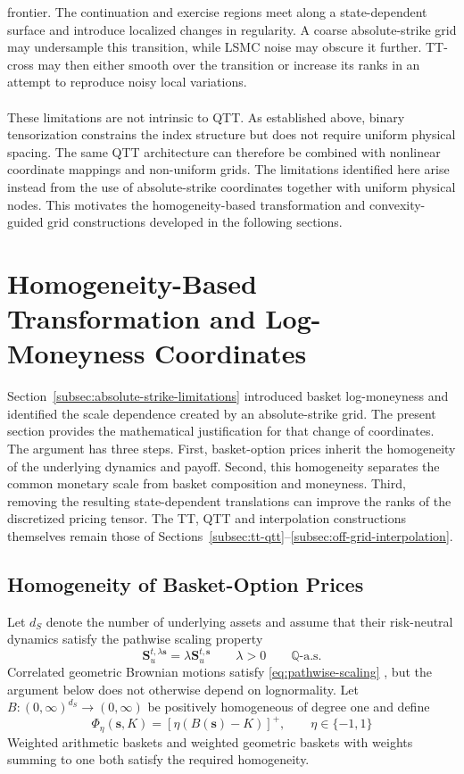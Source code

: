 \documentclass{article}
\numberwithin{equation}{subsection}
\theoremstyle{definition}
\theoremstyle{remark}
\begin{document}
frontier. The continuation and exercise regions meet along a state-dependent
surface and introduce localized changes in regularity. A coarse
absolute-strike grid may undersample this transition, while LSMC noise may
obscure it further. TT-cross may then either smooth over the transition or
increase its ranks in an attempt to reproduce noisy local variations.\\
\\
These limitations are not intrinsic to QTT. As established above, binary
tensorization constrains the index structure but does not require uniform
physical spacing. The same QTT architecture can therefore be combined with
nonlinear coordinate mappings and non-uniform grids. The limitations identified
here arise instead from the use of absolute-strike coordinates together with
uniform physical nodes. This motivates the homogeneity-based transformation and
convexity-guided grid constructions developed in the following sections.
\section{Homogeneity-Based Transformation and Log-Moneyness Coordinates}
\label{sec:homogeneity-transformation}
Section~\ref{subsec:absolute-strike-limitations} introduced basket
log-moneyness and identified the scale dependence created by an absolute-strike
grid. The present section provides the mathematical justification for that
change of coordinates. The argument has three steps. First, basket-option
prices inherit the homogeneity of the underlying dynamics and payoff. Second,
this homogeneity separates the common monetary scale from basket composition
and moneyness. Third, removing the resulting state-dependent translations can
improve the ranks of the discretized pricing tensor. The TT, QTT and
interpolation constructions themselves remain those of
Sections~\ref{subsec:tt-qtt}--\ref{subsec:off-grid-interpolation}.
\subsection{Homogeneity of Basket-Option Prices}
\label{subsec:price-homogeneity}
Let \(d_S\) denote the number of underlying assets and assume that their
risk-neutral dynamics satisfy the pathwise scaling property
\begin{equation}
\boldsymbol{S}_u^{t,\lambda\boldsymbol{s}}
=
\lambda\boldsymbol{S}_u^{t,\boldsymbol{s}}
\qquad
\lambda>0
\qquad
\mathbb{Q}\text{-a.s.}
\label{eq:pathwise-scaling}
\end{equation}
Correlated geometric Brownian motions satisfy
\eqref{eq:pathwise-scaling} \cite{black1973pricing,merton1973rational}, but the
argument below does not otherwise depend on lognormality. Let
\(B:(0,\infty)^{d_S}\to(0,\infty)\) be positively homogeneous of degree one and
define
\begin{equation}
\Phi_\eta(\boldsymbol{s},K)
=
\left[
\eta\left(B(\boldsymbol{s})-K\right)
\right]^+,
\qquad
\eta\in\{-1,1\}
\label{eq:basket-payoff}
\end{equation}
Weighted arithmetic baskets and weighted geometric baskets with weights
summing to one both satisfy the required homogeneity.
\end{document}
